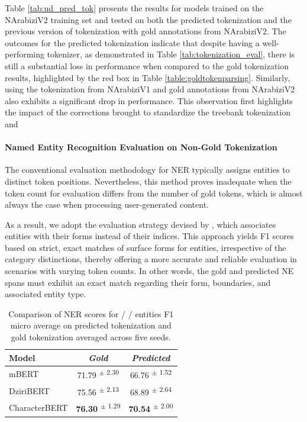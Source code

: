 \documentclass[11pt]{article}
\newcommand{\org}{{\sc {\tt ORG}}\xspace}
\newcommand{\loc}{{\sc {\tt LOC}}\xspace}
\newcommand{\per}{{\sc {\tt PER}}\xspace}
\begin{document}
Table \ref{tab:ud_pred_tok} presents the results for models trained on the NArabiziV2 training set and tested on both the predicted tokenization and the previous version of tokenization with gold annotations from NArabiziV2. The outcomes for the predicted tokenization indicate that despite having a well-performing tokenizer, as demonstrated in Table \ref{tab:tokenization_eval}, there is still a substantial loss in performance when compared to the gold tokenization results, highlighted by the red box in Table \ref{table:goldtokenparsing}. Similarly, using the tokenization from NArabiziV1 and gold annotations from NArabiziV2 also exhibits a significant drop in performance. This observation first highlights the impact of the corrections brought to standardize the  treebank tokenization and 

\paragraph{Named Entity Recognition Evaluation on Non-Gold Tokenization}

The conventional evaluation methodology for NER typically assigns entities to distinct token positions. Nevertheless, this method proves inadequate when the token count for evaluation differs from the number of gold tokens, which is almost always the case when processing user-generated content. 

As a result, we adopt the evaluation strategy devised by \citet{bareket-tsarfaty-2021-neural}, which associates entities with their forms instead of their indices. This approach yields F1 scores based on strict, exact matches of surface forms for entities, irrespective of the category distinctions, thereby offering a more accurate and reliable evaluation in scenarios with varying token counts. In other words, the gold and predicted NE spans must exhibit an exact match regarding their form, boundaries, and associated entity type.
\begin{table}[!h]
\footnotesize
\centering
\begin{tabular}{lcc}
\toprule
Model & \textit{Gold} & \textit{Predicted} \\
\midrule
mBERT   & 71.79 \textsuperscript{$\pm$ 2.30}  & 66.76 \textsuperscript{$\pm$ 1.52}\\
DziriBERT    & 75.56 \textsuperscript{$\pm$ 2.13}   & 68.89 \textsuperscript{$\pm$ 2.64} \\
 CharacterBERT   & \textbf{76.30} \textsuperscript{$\pm$ 1.29}  & \textbf{70.54} \textsuperscript{$\pm$ 2.00}  \\
\bottomrule
\end{tabular}
\caption{Comparison of NER scores for \per / \loc / \org entities F1 micro average on predicted tokenization and gold tokenization averaged across five seeds.}
\label{tab:dataset_ner_tok}
\end{table}
\end{document}
